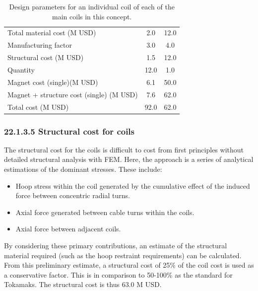 \begin{table}[h]
{\begin{tabular}{lcc}
Total material cost (M USD) & 2.0 & 12.0 \\
Manufacturing factor & 3.0 & 4.0 \\
Structural cost (M USD) & 1.5 & 12.0 \\
Quantity & 12.0 & 1.0 \\
Magnet cost (single)(M USD) & 6.1 & 50.0 \\
Magnet + structure cost (single) (M USD) & 7.6 & 62.0 \\
\hline
Total cost (M USD) & 92.0 & 62.0 \\
\hline
\end{tabular}}
\caption{Design parameters for an individual coil of each of the main coils in this concept.}
\label{your-table-label}
\end{table}


\subsubsection*{22.1.3.5 Structural cost for coils}

The structural cost for the coils is difficult to cost from first principles without detailed structural analysis with FEM. Here, the approach is a series of analytical estimations of the dominant stresses. These include:

\begin{itemize}
    \item Hoop stress within the coil generated by the cumulative effect of the induced force between concentric radial turns.
    \item Axial force generated between cable turns within the coils. 
    \item Axial force between adjacent coils.
\end{itemize}


By considering these primary contributions, an estimate of the structural material required (such as the hoop restraint requirements) can be calculated. From this preliminary estimate, a structural cost of 25\% of the coil cost is used as a conservative factor. This is in comparison to 50-100\% as the standard for Tokamaks. The structural cost is thus 63.0 M USD.


